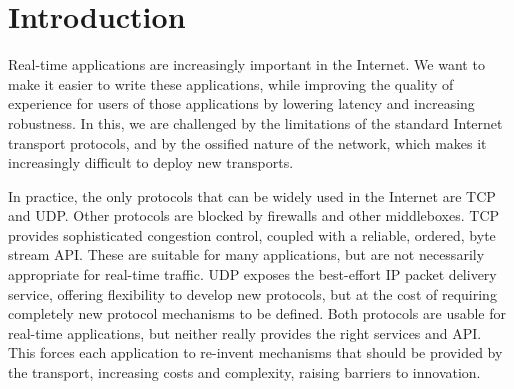 \documentclass[10pt]{sig-alternate-05-2015}
\begin{document}

\printccsdesc

\section{Introduction}

%

Real-time applications are increasingly important in the Internet.
We want to make it easier to write these applications, while improving
the quality of experience for users of those applications by lowering
latency and increasing robustness.
In this, we are challenged by the limitations of the standard Internet
transport protocols, and by the ossified nature of the network, which makes
it increasingly difficult to deploy new transports.


In practice, the only protocols that can be widely used in the Internet are
TCP and UDP. Other protocols are blocked by firewalls and other middleboxes.
TCP provides sophisticated congestion control, coupled with a reliable,
ordered, byte stream API. These are suitable for many applications, but are
not necessarily appropriate for real-time traffic.  UDP exposes the best-effort
IP packet delivery service, offering flexibility to develop new protocols,
but at the cost of requiring completely new protocol mechanisms to be
defined. Both protocols are usable for real-time applications, but neither
really provides the right services and API.  This forces each application
to re-invent mechanisms that should be provided by the transport, increasing
costs and complexity, raising barriers to innovation.
\end{document}
